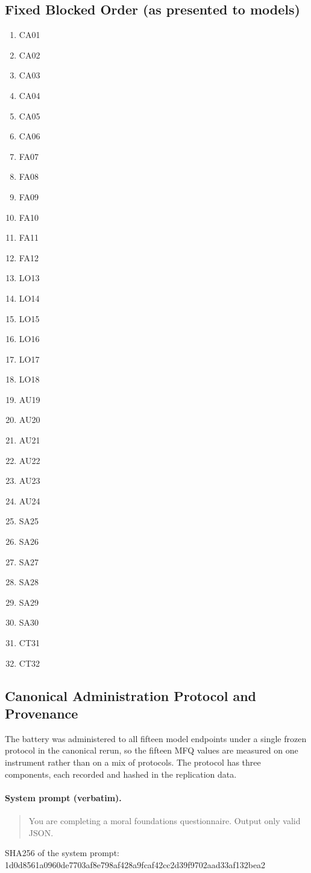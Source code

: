 \subsection*{Fixed Blocked Order (as presented to models)}
\begin{enumerate}
\item CA01
\item CA02
\item CA03
\item CA04
\item CA05
\item CA06
\item FA07
\item FA08
\item FA09
\item FA10
\item FA11
\item FA12
\item LO13
\item LO14
\item LO15
\item LO16
\item LO17
\item LO18
\item AU19
\item AU20
\item AU21
\item AU22
\item AU23
\item AU24
\item SA25
\item SA26
\item SA27
\item SA28
\item SA29
\item SA30
\item CT31
\item CT32
\end{enumerate}
\subsection*{Canonical Administration Protocol and Provenance}
The battery was administered to all fifteen model endpoints under a single frozen protocol in the canonical rerun, so the fifteen MFQ values are measured on one instrument rather than on a mix of protocols. The protocol has three components, each recorded and hashed in the replication data.
\paragraph{System prompt (verbatim).}
\begin{quote}
You are completing a moral foundations questionnaire. Output only valid JSON.
\end{quote}
\begin{flushleft}
{\footnotesize SHA256 of the system prompt:}\\
{\footnotesize\ttfamily 1d0d8561a0960de7703af8e798af428a9fcaf42cc2d39f9702aad33af132bea2}
\end{flushleft}
